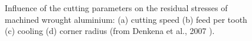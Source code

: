 \begin{figure}[ht]
	\centering
	\noindent{}
	\decoRule
	\caption[Influence of the cutting parameters on the residual stresses of machined wrought aluminium: (a) cutting speed (b) feed per tooth (c) cooling (d) corner radius.]{Influence of the cutting parameters on the residual stresses of machined wrought aluminium: (a) cutting speed (b) feed per tooth (c) cooling (d) corner radius (from Denkena et al., 2007 \parencite{Denkena2007}).}
	\label{fig:Mach}
\end{figure}


